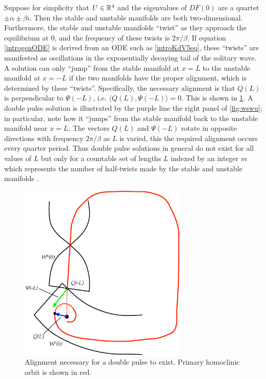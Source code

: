 \documentclass[thesis.tex]{subfiles}
\begin{document}
Suppose for simplicity that $U \in \mathbb{R}^4$ and the eigenvalues of $DF(0)$ are a quartet $\pm \alpha \pm \beta i$. Then the stable and unstable manifolds are both two-dimensional. Furthermore, the stable and unstable manifolds ``twist'' as they approach the equilibrium at 0, and the frequency of these twists is $2 \pi / \beta$. If equation \cref{introgenODE} is derived from an ODE such as \cref{introKdV5eq}, these ``twists'' are manifested as oscillations in the exponentially decaying tail of the solitary wave. A solution can only ``jump'' from the stable manifold at $x = L$ to the unstable manifold at $x = -L$ if the two manifolds have the proper alignment, which is determined by these ``twists''. Specifically, the necessary alignment is that $Q(L)$ is perpendicular to $\Psi(-L)$, i.e. $\langle Q(L), \Psi(-L) \rangle = 0$. This is shown in \cref{fig:manifoldslineup}. A double pulse solution is illustrated by the purple line the right panel of \cref{fig:wswu}; in particular, note how it ``jumps'' from the stable manifold back to the unstable manifold near $x = L$. The vectors $Q(L)$ and $\Psi(-L)$ rotate in opposite directions with frequency $2 \pi/\beta$ as $L$ is varied, this the required alignment occurs every quarter period. Thus double pulse solutions in general do not exist for all values of $L$ but only for a countable set of lengths $L$ indexed by an integer $m$ which represents the number of half-twists made by the stable and unstable manifolds \cite{SandstedeStrut}. 
\begin{figure}
\begin{center}
\includegraphics[width=8cm]{images/intro/manifoldslineup}
\caption[Alignment of manifolds necessary for a double pulse]{Alignment necessary for a double pulse to exist. Primary homoclinic orbit is shown in red.}
\label{fig:manifoldslineup}
\end{center}
\end{figure} 
\end{document}
